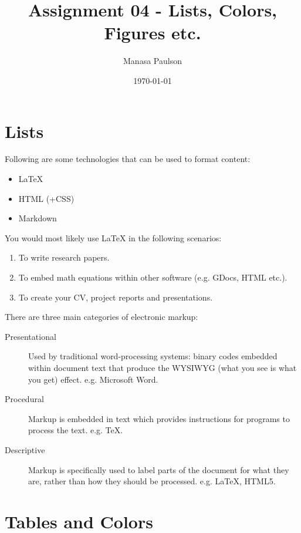 \documentclass[12pt,a4paper]{article}
\title{Assignment 04 - Lists, Colors, Figures etc.}
\author{Manasa Paulson}
\date{\today}
\begin{document}
	
	\maketitle
	\tableofcontents
	\newpage
	
	\section{Lists}
	
	Following are some technologies that can be used to format content:
	
	\begin{itemize}
		\item \LaTeX
		\item HTML (+CSS)
		\item Markdown
	\end{itemize}
	
	You would most likely use \LaTeX{} in the following scenarios:
	
	\begin{enumerate}
		\item To write research papers.
		\item To embed math equations within other software
		(e.g. GDocs, HTML etc.).
		\item To create your CV, project reports and presentations.
	\end{enumerate}
	
	There are three main categories of electronic markup:
	
	\begin{description}
		\item[Presentational] Used by traditional word-processing systems:
		binary codes embedded within document text that produce the
		WYSIWYG (what you see is what you get) effect.
		e.g. Microsoft Word.
		
		\item[Procedural] Markup is embedded in text which provides
		instructions for programs to process the text. e.g. TeX.
		
		\item[Descriptive] Markup is specifically used to label parts
		of the document for what they are, rather than how they should
		be processed. e.g. \LaTeX{}, HTML5.
	\end{description}
	
	\section{Tables and Colors}
	
\end{document}
